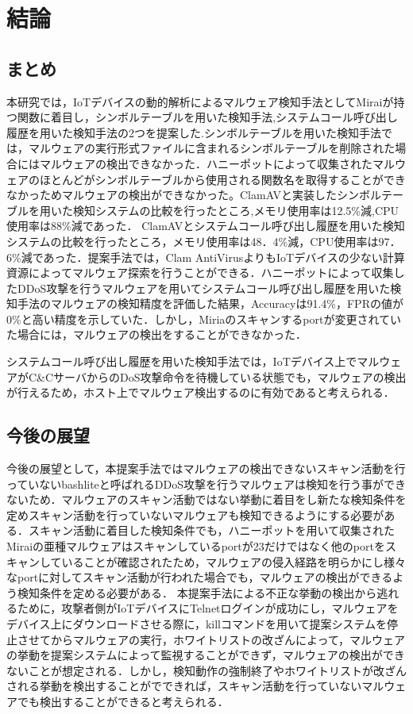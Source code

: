 \chapter{結論}

\section{まとめ}
本研究では，IoTデバイスの動的解析によるマルウェア検知手法としてMiraiが持つ関数に着目し，シンボルテーブルを用いた検知手法,システムコール呼び出し履歴を用いた検知手法の2つを提案した.シンボルテーブルを用いた検知手法では，マルウェアの実行形式ファイルに含まれるシンボルテーブルを削除された場合にはマルウェアの検出できなかった．ハニーポットによって収集されたマルウェアのほとんどがシンボルテーブルから使用される関数名を取得することができなかっためマルウェアの検出ができなかった。ClamAVと実装したシンボルテーブルを用いた検知システムの比較を行ったところ,メモリ使用率は12.5\%減,CPU使用率は88\%減であった．
ClamAVとシステムコール呼び出し履歴を用いた検知システムの比較を行ったところ，メモリ使用率は48．4\%減，CPU使用率は97．6\%減であった．提案手法では，Clam AntiVirusよりもIoTデバイスの少ない計算資源によってマルウェア探索を行うことができる．ハニーポットによって収集したDDoS攻撃を行うマルウェアを用いてシステムコール呼び出し履歴を用いた検知手法のマルウェアの検知精度を評価した結果，Accuracyは91.4\%，FPRの値が0\%と高い精度を示していた．しかし，Miriaのスキャンするportが変更されていた場合には，マルウェアの検出をすることができなかった．\par
システムコール呼び出し履歴を用いた検知手法では，IoTデバイス上でマルウェアがC\&CサーバからのDoS攻撃命令を待機している状態でも，マルウェアの検出が行えるため，ホスト上でマルウェア検出するのに有効であると考えられる．

\section{今後の展望}
今後の展望として，本提案手法ではマルウェアの検出できないスキャン活動を行っていないbashliteと呼ばれるDDoS攻撃を行うマルウェアは検知を行う事ができないため．マルウェアのスキャン活動ではない挙動に着目をし新たな検知条件を定めスキャン活動を行っていないマルウェアも検知できるようにする必要がある．スキャン活動に着目した検知条件でも，ハニーポットを用いて収集されたMiraiの亜種マルウェアはスキャンしているportが23だけではなく他のportをスキャンしていることが確認されたため，マルウェアの侵入経路を明らかにし様々なportに対してスキャン活動が行われた場合でも，マルウェアの検出ができるよう検知条件を定める必要がある．
本提案手法による不正な挙動の検出から逃れるために，攻撃者側がIoTデバイスにTelnetログインが成功にし，マルウェアをデバイス上にダウンロードさせる際に，killコマンドを用いて提案システムを停止させてからマルウェアの実行，ホワイトリストの改ざんによって，マルウェアの挙動を提案システムによって監視することができず，マルウェアの検出ができないことが想定される．しかし，検知動作の強制終了やホワイトリストが改ざんされる挙動を検出することがでできれば，スキャン活動を行っていないマルウェアでも検出することができると考えられる．
